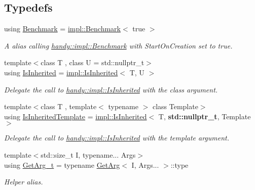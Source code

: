 \subsection*{Typedefs}
\begin{DoxyCompactItemize}
\item 
using \hyperlink{namespacehandy_a921823a1a59f12ce0c0ded12503b0544}{Benchmark} = \hyperlink{classhandy_1_1impl_1_1Benchmark}{impl\+::\+Benchmark}$<$ true $>$
\begin{DoxyCompactList}\small\item\em A alias calling \hyperlink{classhandy_1_1impl_1_1Benchmark}{handy\+::impl\+::\+Benchmark} with {\ttfamily Start\+On\+Creation} set to {\ttfamily true}. \end{DoxyCompactList}\item 
{\footnotesize template$<$class T , class U  = std\+::nullptr\+\_\+t$>$ }\\using \hyperlink{group__InheritanceGroup_ga534fbf017347da385a1fea5a1a9d6714}{Is\+Inherited} = \hyperlink{structhandy_1_1impl_1_1IsInherited}{impl\+::\+Is\+Inherited}$<$ T, U $>$
\begin{DoxyCompactList}\small\item\em Delegate the call to \hyperlink{structhandy_1_1impl_1_1IsInherited}{handy\+::impl\+::\+Is\+Inherited} with the class argument. \end{DoxyCompactList}\item 
{\footnotesize template$<$class T , template$<$ typename $>$ class Template$>$ }\\using \hyperlink{group__InheritanceGroup_gaea8281081535355f96f3b6ae97f79691}{Is\+Inherited\+Template} = \hyperlink{structhandy_1_1impl_1_1IsInherited}{impl\+::\+Is\+Inherited}$<$ T, {\bf std\+::nullptr\+\_\+t}, Template $>$
\begin{DoxyCompactList}\small\item\em Delegate the call to \hyperlink{structhandy_1_1impl_1_1IsInherited}{handy\+::impl\+::\+Is\+Inherited} with the template argument. \end{DoxyCompactList}\item 
{\footnotesize template$<$std\+::size\+\_\+t I, typename... Args$>$ }\\using \hyperlink{group__GetArgGroup_gaed885c745628529b328db1c511d841fc}{Get\+Arg\+\_\+t} = typename \hyperlink{structhandy_1_1GetArg}{Get\+Arg}$<$ I, Args... $>$\+::type
\begin{DoxyCompactList}\small\item\em Helper alias. \end{DoxyCompactList}\item 

\end{DoxyCompactItemize}
